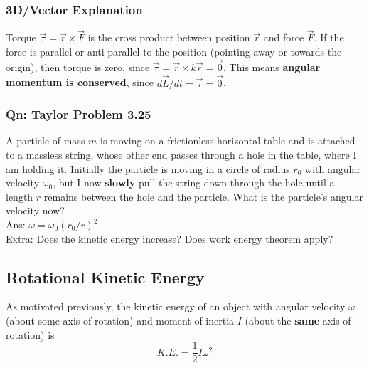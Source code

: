 \documentclass{article}
\begin{document}
\subsubsection{3D/Vector Explanation}
Torque $\vec{\tau} = \vec{r} \times \vec{F}$ is the cross product between position $\vec{r}$ and force $\vec{F}$. If the force is parallel or anti-parallel to the position (pointing away or towards the origin), then torque is zero, since $\vec{\tau} = \vec{r} \times k\vec{r} = \vec{0}$. This means \textbf{angular momentum is conserved}, since ${d\vec{L}}/dt = \vec{\tau} = \vec{0}$.
\subsubsection{Qn: Taylor Problem 3.25}
A particle of mass $m$ is moving on a frictionless horizontal table and is attached to a massless string, whose other end passes through a hole in the table, where I am holding it. Initially the particle is moving in a circle of radius $r_0$ with angular velocity $\omega_0$, but I now \textbf{slowly} pull the string down through the hole until a length $r$ remains between the hole and the particle. What is the particle's angular velocity now?\\[10pt]
Ans: $\omega = \omega_0 (r_0/r)^2 $ \\[10pt]
Extra: Does the kinetic energy increase? Does work energy theorem apply? 


\subsection{Rotational Kinetic Energy}
As motivated previously, the kinetic energy of an object with angular velocity $\omega$ (about some axis of rotation) and moment of inertia $I$ (about the \textbf{same} axis of rotation) is $$K.E. = \frac{1}{2} I \omega^2$$
\end{document}
